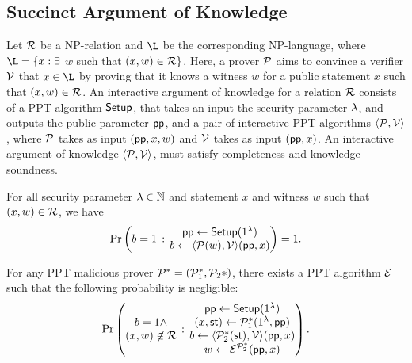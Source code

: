 \subsection{Succinct Argument of Knowledge}
\label{sec:aok}

Let $\mathcal{R}$ be a NP-relation and $\L$ be the corresponding NP-language, where $\L=\{x : \exists$ $w$ such that $(x,w) \in \mathcal{R}\}$. Here, a prover $\mathcal{P}$ aims to convince a verifier $\mathcal{V}$ that $x\in \L$ by proving that it knows a witness $w$ for a public statement $x$ such that $(x,w)\in \mathcal{R}$. An interactive argument of knowledge for a relation $\mathcal{R}$ consists of a PPT algorithm $\mathsf{Setup}$, that takes an input the security parameter $\lambda$, and outputs the public parameter $\mathsf{pp}$, and a pair of interactive PPT algorithms $\langle\mathcal{P},\mathcal{V}\rangle$, where $\mathcal{P}$ takes as input $(\mathsf{pp},x,w)$ and $\mathcal{V}$ takes as input $(\mathsf{pp},x)$. An interactive argument of knowledge  $\langle\mathcal{P},\mathcal{V}\rangle$, must satisfy completeness and knowledge soundness. %

\begin{definition}[Completeness]
	\label{def:aok-comp}
	For all security parameter $\lambda \in \mathbb{N}$ and statement $x$ and witness $w$ such that $(x,w)\in \mathcal{R}$, we have
	\[
	\Pr \left( 
	\begin{matrix}
		b=1
	\end{matrix}
	\,:\,
	\begin{matrix}
		\mathsf{pp} \leftarrow \mathsf{Setup}(1^{\lambda}) \\
		b \leftarrow \langle\mathcal{P} (w) ,\mathcal{V}\rangle (\mathsf{pp},x)
	\end{matrix}
	\right) = 1.
	\]
\end{definition}

\begin{definition}
	\label{def:aok-ks}
	For any PPT malicious prover $\mathcal{P}^* = (\mathcal{P}_1^*,\mathcal{P}_2*)$, there exists a PPT algorithm $\mathcal{E}$ such that the following probability is negligible:
	\[
		\Pr \left( 
		\begin{matrix}
			b=1 \wedge \\
			(x,w)\not\in \mathcal{R}
		\end{matrix}
		\,:\,
		\begin{matrix}
			\mathsf{pp} \leftarrow \mathsf{Setup}(1^{\lambda}) \\
			(x,\mathsf{st}) \leftarrow \mathcal{P}_1^*(1^{\lambda},\mathsf{pp}) \\
			b \leftarrow \langle\mathcal{P}_2^* (\mathsf{st}) ,\mathcal{V}\rangle (\mathsf{pp},x) \\
			w \leftarrow \mathcal{E}^{\mathcal{P}_2^*} (\mathsf{pp},x)
		\end{matrix}
		\right) .
		\]	
\end{definition}

